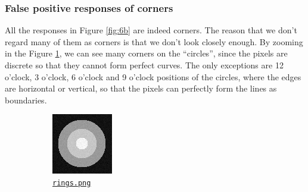 \subsubsection{False positive responses of corners}
All the responses in Figure \ref{fig:6b} are indeed corners.
The reason that we don't regard many of them as corners is that we don't look closely enough.
By zooming in the Figure \ref{fig:6a}, we can see many corners on the ``circles'', since the pixels are discrete so that they cannot form perfect curves.
The only exceptions are 12 o'clock, 3 o'clock, 6 o'clock and 9 o'clock positions of the circles, where the edges are horizontal or vertical, so that the pixels can perfectly form the lines as boundaries.
\begin{figure}[htbp]
	\centering
	\begin{subfigure}[t]{0.4\textwidth}
	    \centering
		\includegraphics[width=\textwidth]{hw2/problem3/rings.png}
		\caption{\href{./hw2/problem3/rings.png}{\texttt{rings.png}}}\label{fig:6a}
	\end{subfigure}
	\qquad
	\begin{subfigure}[t]{0.4\textwidth}
	    \centering

\end{subfigure}
\end{figure}
